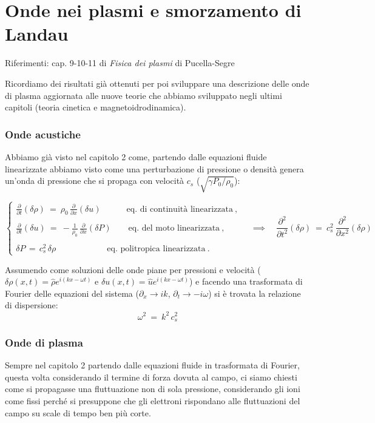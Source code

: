 \chapter{Onde nei plasmi e smorzamento di Landau}

\epigraph{
	Riferimenti: cap. 9-10-11 di \emph{Fisica dei plasmi} di Pucella-Segre
}{}

Ricordiamo dei risultati già ottenuti per poi sviluppare una descrizione delle onde di plasma aggiornata alle nuove teorie che abbiamo sviluppato negli ultimi capitoli (teoria cinetica e magnetoidrodinamica).

\subsection{Onde acustiche}

Abbiamo già visto nel capitolo 2 come, partendo dalle equazioni fluide linearizzate abbiamo visto come una perturbazione di pressione o densità genera un'onda di pressione che si propaga con velocità $c_s$ ($\sqrt{\gamma P_0 /\rho_0}$):

\[ \begin{cases}
	\displaystyle\frac{\partial }{\partial t} (\delta \rho)\ =\ \rho_0\, \displaystyle\frac{\partial}{\partial x} (\delta u)\qquad \quad\text{eq. di continuità linearizzata}\ ,\\ \\
	\displaystyle\frac{\partial }{\partial t} (\delta u)\ =\ - \displaystyle\frac{1}{\rho_0}\,\frac{\partial}{\partial x} (\delta P)\qquad \text{eq. del moto linearizzata}\ ,\\ \\
	\delta P\, =\, c_s^2\, \delta \rho\qquad \qquad\qquad \text{eq. politropica linearizzata}\ .
\end{cases} 
\quad \implies \quad 
\frac{\partial^2}{\partial t^2} (\delta \rho)\ =\ c_s^2\ \frac{\partial^2}{\partial x^2} (\delta \rho)\]

Assumendo come soluzioni delle onde piane per pressioni e velocità ($\delta \rho (x, t) = \hat \rho e^{i(kx-\omega t)}$ e $\delta u (x, t) = \hat u e^{i(kx-\omega t)}$) e facendo una trasformata di Fourier delle equazioni del sistema ($\partial_x\rightarrow ik$, $\partial_t\rightarrow -i\omega$) si è trovata la relazione di dispersione:
\begin{equation}
	\label{acoustic wave}
	\omega^2\ =\ k^2\, c_s^2
\end{equation}


%
%
%
\subsection{Onde di plasma}
Sempre nel capitolo 2 partendo dalle equazioni fluide in trasformata di Fourier, questa volta considerando il termine di forza dovuta al campo, ci siamo chiesti come si propagasse una fluttuazione non di sola pressione, considerando gli ioni come fissi perché si presuppone che gli elettroni rispondano alle fluttuazioni del campo su scale di tempo ben più corte. 

